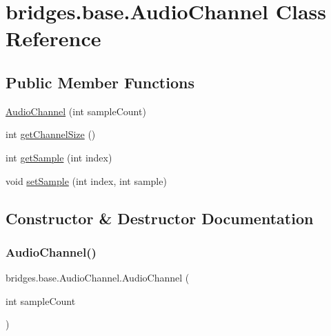 \hypertarget{classbridges_1_1base_1_1_audio_channel}{}\section{bridges.\+base.\+Audio\+Channel Class Reference}
\label{classbridges_1_1base_1_1_audio_channel}
\subsection*{Public Member Functions}
\begin{DoxyCompactItemize}
\item 
\hyperlink{classbridges_1_1base_1_1_audio_channel_a1fb5be6b6ba3f393abedc7cd068e0c49}{Audio\+Channel} (int sample\+Count)
\item 
int \hyperlink{classbridges_1_1base_1_1_audio_channel_af367155c1e380bc7e934af74e74b0ef7}{get\+Channel\+Size} ()
\item 
int \hyperlink{classbridges_1_1base_1_1_audio_channel_a62b3fdc6e9e03996f15216d5f7f2d3fb}{get\+Sample} (int index)
\item 
void \hyperlink{classbridges_1_1base_1_1_audio_channel_aea69a2dab1bb9cc8c930f476b8392fd9}{set\+Sample} (int index, int sample)
\end{DoxyCompactItemize}


\subsection{Constructor \& Destructor Documentation}
\mbox{\label{classbridges_1_1base_1_1_audio_channel_a1fb5be6b6ba3f393abedc7cd068e0c49}} 
\subsubsection{\texorpdfstring{Audio\+Channel()}{AudioChannel()}}
{\footnotesize\ttfamily bridges.\+base.\+Audio\+Channel.\+Audio\+Channel (\begin{DoxyParamCaption}\item[{int}]{sample\+Count }\end{DoxyParamCaption})}



